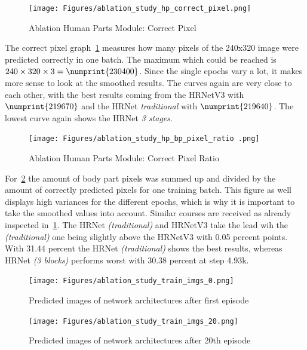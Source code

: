 \begin{figure}[H]
    \centering
    \texttt{[image: Figures/ablation\_study\_hp\_correct\_pixel.png]}
    \decoRule
    \caption[Ablation Human Parts Module: Correct Pixel]{Ablation Human Parts Module: Correct Pixel}
    \label{fig:ablation-correct-px}
\end{figure}

The correct pixel graph~\ref{fig:ablation-correct-px} measures how many pixels of the 240x320 image were predicted
correctly
in one batch. The maximum which could be reached is $240\times320\times3=\numprint{230400}$.
Since the single epochs vary a lot, it makes more sense to look at the smoothed results.
The curves again are very close to each other, with the best results coming from the HRNetV3 with $\numprint{219670}$
and
the HRNet \textit{traditional} with $\numprint{219640}$.
The lowest curve again shows the HRNet \textit{3 stages}.

\begin{figure}[H]
    \centering
    \texttt{[image: Figures/ablation\_study\_hp\_bp\_pixel\_ratio
    .png]}
    \decoRule
    \caption[Ablation Human Parts Module: Correctness Ratio]{Ablation Human Parts Module: Correct Pixel Ratio}
    \label{fig:correct-pixel-ratio}
\end{figure}

For~\ref{fig:correct-pixel-ratio} the amount of body part pixels was summed up and divided by the amount of correctly
predicted pixels for one training batch.
This figure as well displays high variances for the different epochs, which is why it is important to take the smoothed
values into account. Similar courses are received as already inspected in~\ref{fig:ablation-correct-px}.
The HRNet \textit{(traditional)} and HRNetV3 take the lead wih the \textit{(traditional)} one being slightly above the HRNetV3
with 0.05 percent points. With 31.44 percent the HRNet \textit{(traditional)} shows the best results, whereas HRNet
\textit{(3 blocks)} performs worst with 30.38 percent at step 4.93k.

\begin{figure}[H]
    \centering
    \texttt{[image: Figures/ablation\_study\_train\_imgs\_0.png]}
    \decoRule
    \caption[Ablation Human Parts Module: 1st Episode Predictions]{Predicted images of network architectures after first
    episode}
    \label{fig:train-img-0}
\end{figure}
\begin{figure}[H]
    \centering
    \texttt{[image: Figures/ablation\_study\_train\_imgs\_20.png]}
    \decoRule
    \caption[Ablation Human Parts Module: 20th Episode Predictions]{Predicted images of network architectures after 20th
    episode}
    \label{fig:train-img-20}
\end{figure}

